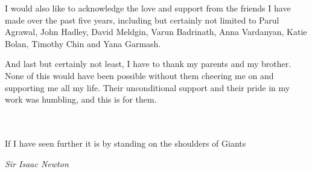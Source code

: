I would also like to acknowledge the love and support from the friends I have made over the past five years, including but certainly not limited to Parul Agrawal, John Hadley, David Meldgin, Varun Badrinath, Anna Vardanyan, Katie Bolan, Timothy Chin and Yana Garmash.

And last but certainly not least, I have to thank my parents and my brother. None of this would have been possible without them cheering me on and supporting me all my life. Their unconditional support and their pride in my work was humbling, and this is for them. \\ \\ \\ 



\epigraph{If I have seen further it is by standing on the shoulders of Giants}{\textit{Sir Isaac Newton}}
